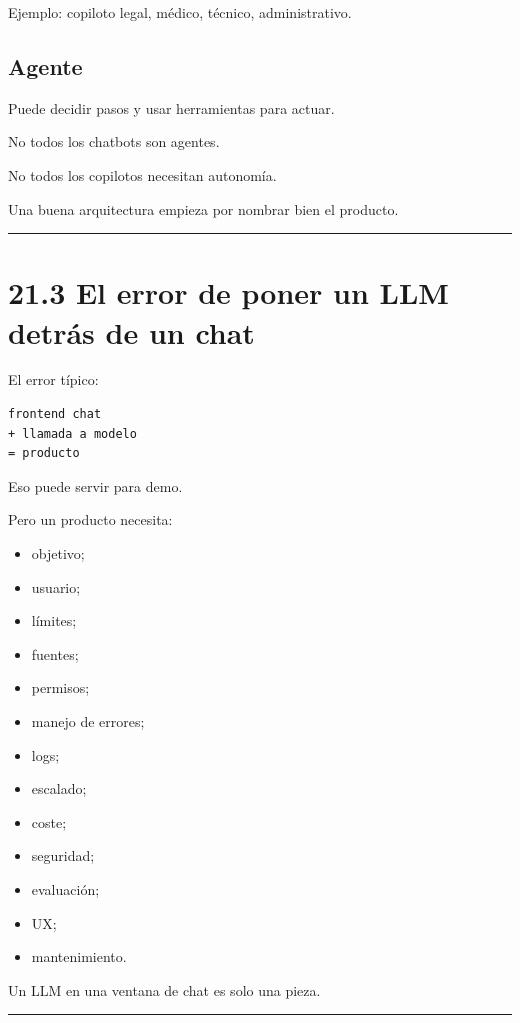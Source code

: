 Ejemplo: copiloto legal, médico, técnico, administrativo.

\subsection{Agente}\label{agente}

Puede decidir pasos y usar herramientas para actuar.

No todos los chatbots son agentes.

No todos los copilotos necesitan autonomía.

Una buena arquitectura empieza por nombrar bien el producto.

\begin{center}\rule{0.5\linewidth}{0.5pt}\end{center}

\section{21.3 El error de poner un LLM detrás de un
chat}\label{el-error-de-poner-un-llm-detruxe1s-de-un-chat}

El error típico:

\begin{lstlisting}
frontend chat
+ llamada a modelo
= producto
\end{lstlisting}

Eso puede servir para demo.

Pero un producto necesita:

\begin{itemize}
\tightlist
\item
  objetivo;
\item
  usuario;
\item
  límites;
\item
  fuentes;
\item
  permisos;
\item
  manejo de errores;
\item
  logs;
\item
  escalado;
\item
  coste;
\item
  seguridad;
\item
  evaluación;
\item
  UX;
\item
  mantenimiento.
\end{itemize}

Un LLM en una ventana de chat es solo una pieza.

\begin{center}\rule{0.5\linewidth}{0.5pt}\end{center}

